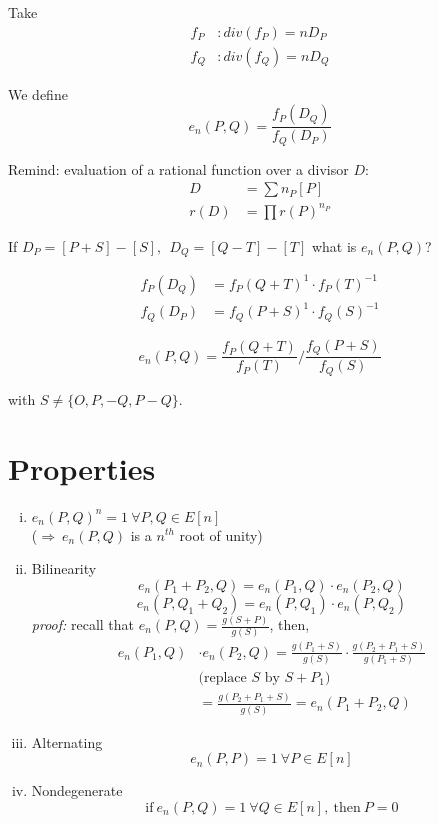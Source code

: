 \documentclass{article}
\theoremstyle{definition}
\begin{document}
Take
\begin{align*}
  f_P &: div(f_P) = n D_P\\
  f_Q &: div(f_Q) = n D_Q
\end{align*}

We define
$$
e_n(P, Q) = \frac{f_P(D_Q)}{f_Q(D_P)}
$$

Remind: evaluation of a rational function over a divisor $D$:
\begin{align*}
  D &= \sum n_P [P]\\
  r(D) &= \prod r(P)^{n_P}
\end{align*}

If $D_P = [P+S] - [S],~~ D_Q=[Q-T]-[T]$ what is $e_n(P, Q)$?

\begin{align*}
  f_P(D_Q) &= f_P(Q+T)^1 \cdot f_P(T)^{-1}\\
  f_Q(D_P) &= f_Q(P+S)^1 \cdot f_Q(S)^{-1}
\end{align*}

$$
e_n(P, Q) = \frac{f_P(Q+T)}{f_P(T)} / \frac{f_Q(P+S)}{f_Q(S)}
$$

with $S \neq \{O, P, -Q, P-Q \}$.


\section{Properties}
\begin{enumerate}[i.]
  \item $e_n(P, Q)^n = 1 ~\forall P,Q \in E[n]$\\
    ($\Rightarrow~ e_n(P,Q)$ is a $n^{th}$ root of unity)
  \item Bilinearity
    $$e_n(P_1+P_2, Q) = e_n(P_1, Q) \cdot e_n(P_2, Q)$$
    $$e_n(P, Q_1+Q_2) = e_n(P, Q_1) \cdot e_n(P, Q_2)$$
    \emph{proof:}
    recall that $e_n(P,Q)=\frac{g(S+P)}{g(S)}$, then,
    \begin{align*}
      e_n(P_1, Q) &\cdot e_n(P_2, Q) = \frac{g(P_1 + S)}{g(S)} \cdot \frac{g(P_2 + P_1 + S)}{g(P_1 + S)}\\
				    &\text{(replace $S$ by $S+P_1$)}\\
				    &= \frac{g(P_2 + P_1 + S)}{g(S)} = e_n(P_1+P_2, Q)
    \end{align*}
  \item Alternating
    $$e_n(P, P)=1 ~\forall P\in E[n]$$
  \item Nondegenerate
    $$\text{if}~ e_n(P,Q)=1 ~\forall Q\in E[n],~ \text{then}~ P=0$$
\end{enumerate}
\end{document}
